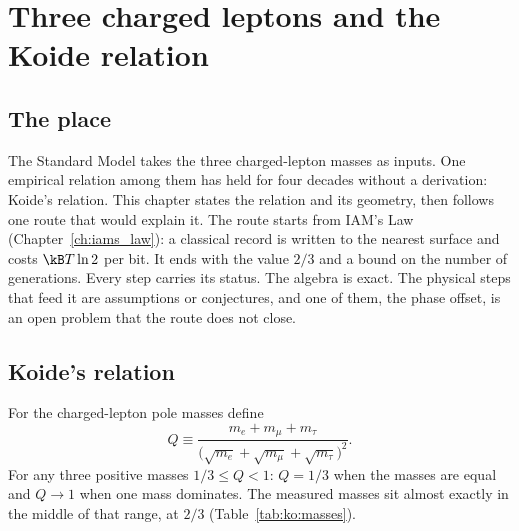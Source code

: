 \chapter{Three charged leptons and the Koide relation}\label{ch:koide}

\section*{The place}
The Standard Model takes the three charged-lepton masses as inputs. One empirical relation among them has held for four decades without a
derivation: Koide's relation. This chapter states the relation and its geometry, then follows one route that would explain it. The route
starts from IAM's Law (Chapter~\ref{ch:iams_law}): a classical record is written to the nearest surface and costs $\kB T\ln2$ per bit. It
ends with the value $2/3$ and a bound on the number of generations. Every step carries its status. The algebra is exact. The physical steps
that feed it are assumptions or conjectures, and one of them, the phase offset, is an open problem that the route does not close.

\section{Koide's relation}\label{sec:ko:relation}
For the charged-lepton pole masses define~\cite{Koide1982,Koide1983,Koide1983b}
\begin{equation}
Q\equiv\frac{m_e+m_\mu+m_\tau}{\big(\sqrt{m_e}+\sqrt{m_\mu}+\sqrt{m_\tau}\big)^2}.\label{eq:ko:Q}
\end{equation}
For any three positive masses $1/3\le Q<1$: $Q=1/3$ when the masses are equal and $Q\to1$ when one mass dominates. \derived{} The measured
masses sit almost exactly in the middle of that range, at $2/3$ (Table~\ref{tab:ko:masses}).

